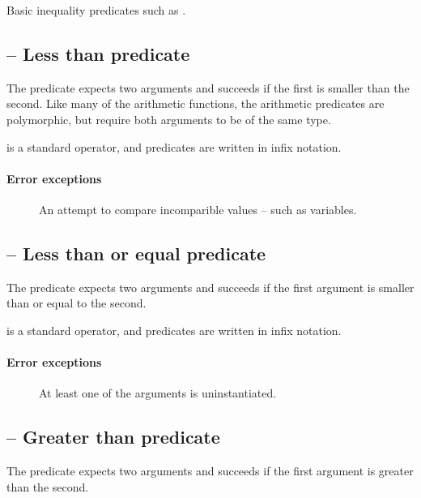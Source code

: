 Basic inequality predicates such as \function{<}.
  
\subsection{\function{<} -- Less than predicate}
The \function{<} predicate expects two arguments and succeeds if the first is smaller than the second. Like many of the arithmetic functions, the arithmetic predicates are polymorphic, but require both arguments to be of the same type. 

\q{<} is a standard operator, and \q{<} predicates are written in infix notation.
    
\paragraph{Error exceptions}
\begin{description}
\item[]
An attempt to compare incomparible values -- such as variables.
\end{description}

\subsection{\function{=<} -- Less than or equal predicate}
The \function{=<} predicate expects two arguments and succeeds if the first argument is smaller than or equal to the second.
    
\q{=<} is a standard operator, and \q{=<} predicates are written in infix notation.

\paragraph{Error exceptions}
\begin{description}
\item[]
At least one of the arguments is uninstantiated.
\end{description}

\subsection{\function{>} -- Greater than predicate}
The \function{>} predicate expects two arguments and succeeds if the first argument is greater than the second.
    
